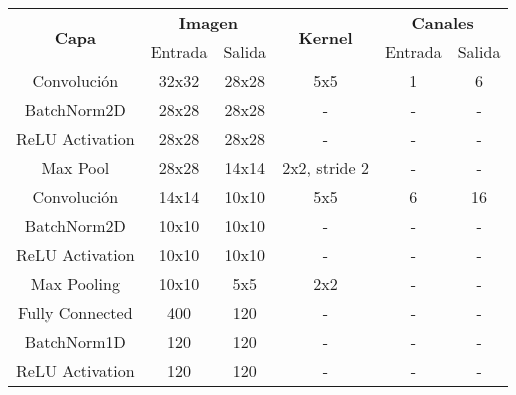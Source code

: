 \begin{table}[]
\begin{tabular}{|c|cc|c|cc|}
\hline
\multirow{2}{*}{\textbf{Capa}} & \multicolumn{2}{c|}{\textbf{Imagen}}      & \multirow{2}{*}{\textbf{Kernel}} & \multicolumn{2}{c|}{\textbf{Canales}}    \\ \cline{5-6} 
                               & Entrada                    & Salida       &                                  & Entrada                & Salida \\ \hline
Convolución                    & \multicolumn{1}{c|}{32x32} & 28x28        & 5x5                              & \multicolumn{1}{c|}{1} & 6      \\ \hline
BatchNorm2D                    & \multicolumn{1}{c|}{28x28} & 28x28        & -                                & \multicolumn{1}{c|}{-} & -      \\ \hline
ReLU Activation                & \multicolumn{1}{c|}{28x28} & 28x28        & -                                & \multicolumn{1}{c|}{-} & -      \\ \hline
Max Pool                           & \multicolumn{1}{c|}{28x28} & 14x14        & 2x2, stride 2                              & \multicolumn{1}{c|}{-} & -      \\ \hline
Convolución                    & \multicolumn{1}{c|}{14x14} & 10x10        & 5x5                              & \multicolumn{1}{c|}{6} & 16     \\ \hline
BatchNorm2D                    & \multicolumn{1}{c|}{10x10} & 10x10        & -                                & \multicolumn{1}{c|}{-} & -      \\ \hline
ReLU Activation                & \multicolumn{1}{c|}{10x10} & 10x10        & -                                & \multicolumn{1}{c|}{-} & -      \\ \hline
Max Pooling                    & \multicolumn{1}{c|}{10x10} & 5x5          & 2x2                              & \multicolumn{1}{c|}{-} & -      \\ \hline
Fully Connected                & \multicolumn{1}{c|}{400}   & 120          & -                                & \multicolumn{1}{c|}{-} & -      \\ \hline
BatchNorm1D                    & \multicolumn{1}{c|}{120}   & 120          & -                                & \multicolumn{1}{c|}{-} & -      \\ \hline
ReLU Activation                & \multicolumn{1}{c|}{120}   & 120          & -                                & \multicolumn{1}{c|}{-} & -      \\ \hline

\end{tabular}
\end{table}
